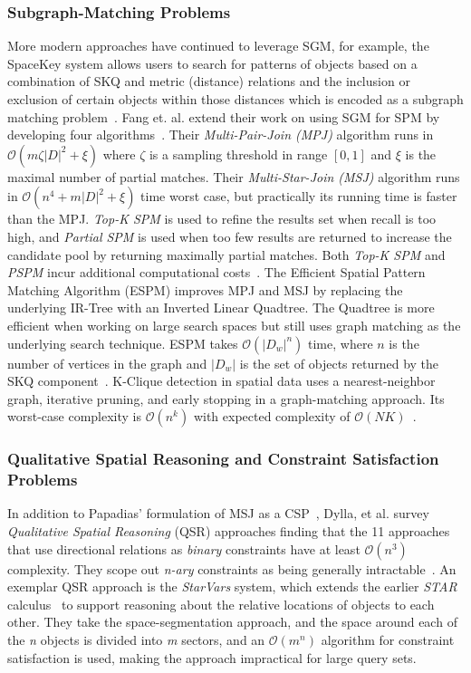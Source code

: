 \subsubsection{Subgraph-Matching Problems}
\par{
    More modern approaches have continued to leverage SGM, for example, the SpaceKey system allows users to search for patterns of objects based on a combination of SKQ and metric (distance) relations and the inclusion or exclusion of certain objects within those distances which is encoded as a subgraph matching problem~\cite{Fang2018}.
    Fang et. al. extend their work on using SGM for SPM by developing four algorithms~\cite{Fang2019}. 
    Their \textit{Multi-Pair-Join (MPJ)} algorithm runs in $\mathcal{O}(m\zeta |D|^2+\xi)$ where $\zeta$ is a sampling threshold in range $[0,1]$ and $\xi$ is the maximal number of partial matches. 
    Their \textit{Multi-Star-Join (MSJ)} algorithm runs in $\mathcal{O}(n^4+m|D|^2+\xi)$ time worst case, but practically its running time is faster than the MPJ. 
    \textit{Top-K SPM} is used to refine the results set when recall is too high, and \textit{Partial SPM} is used when too few results are returned to increase the candidate pool by returning maximally partial matches. 
    Both \textit{Top-K SPM} and \textit{PSPM} incur additional computational costs~\cite{Fang2019}.
    The Efficient Spatial Pattern Matching Algorithm (ESPM) improves MPJ and MSJ by replacing the underlying IR-Tree with an Inverted Linear Quadtree. 
    The Quadtree is more efficient when working on large search spaces but still uses graph matching as the underlying search technique. 
    ESPM takes $\mathcal{O}(|D_w|^n)$ time, where $n$ is the number of vertices in the graph and $|D_w|$ is the set of objects returned by the SKQ component~\cite{Chen2019}. 
    K-Clique detection in spatial data uses a nearest-neighbor graph, iterative pruning, and early stopping in a graph-matching approach. 
    Its worst-case complexity is $\mathcal{O}(n^k)$ with expected complexity of $\mathcal{O}(NK)$~\cite{Taniguchi2022}.
    }  

\subsubsection{Qualitative Spatial Reasoning and Constraint Satisfaction Problems}
    \par{
    In addition to Papadias' formulation of MSJ as a CSP~\cite{Papadias1998}, Dylla, et al. survey \textit{Qualitative Spatial Reasoning} (QSR) approaches finding that the 11 approaches that use directional relations as \textit{binary} constraints have at least $\mathcal{O}(n^3)$ complexity. 
    They scope out \textit{n-ary} constraints as being generally intractable~\cite{Dylla2017}. 
    An exemplar QSR approach is the \textit{StarVars} system, which extends the earlier \textit{STAR} calculus~\cite{Renz2004} to support reasoning about the relative locations of objects to each other.
    They take the space-segmentation approach, and the space around each of the \textit{n} objects is divided into \textit{m} sectors, and an $\mathcal{O}(m^n)$ algorithm for constraint satisfaction is used, making the approach impractical for large query sets.}
    
